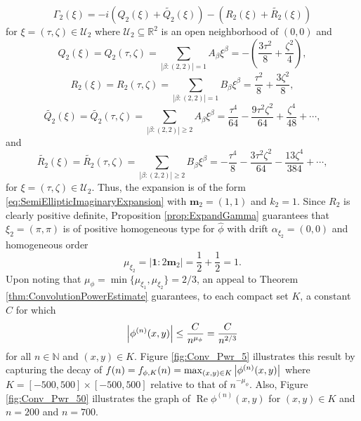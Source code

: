 \documentclass[11pt]{article}
\newenvironment{example}
  {\pushQED{\qed}\renewcommand{\qedsymbol}{$\triangle$}\examplex}
  {\popQED\endexamplex}
\theoremstyle{remark}
\renewcommand\Re{\operatorname{Re}}%
\begin{document}
\begin{example}
\begin{equation*}
    \Gamma_2(\xi)=-i\left(Q_2(\xi)+\widetilde{Q_2}(\xi)\right)-\left(R_2(\xi)+\widetilde{R_2}(\xi)\right)
\end{equation*}
for $\xi=(\tau,\zeta)\in\mathcal{U}_2$ where $\mathcal{U}_2\subseteq\mathbb{R}^2$ is an open neighborhood of $(0,0)$ and 
\begin{equation*}
    Q_2(\xi)=Q_2(\tau,\zeta)=\sum_{|\beta:(2,2)|=1}A_\beta \xi^\beta=-\left(\frac{3\tau^2}{8}+\frac{\zeta^2}{4}\right),
\end{equation*}
\begin{equation*}
    R_2(\xi)=R_2(\tau,\zeta)=\sum_{|\beta:(2,2)|=1}B_\beta\xi^\beta=\frac{\tau^2}{8}+\frac{3\zeta^2}{8},
\end{equation*}
\begin{equation*}
    \widetilde{Q_2}(\xi)=\widetilde{Q_2}(\tau,\zeta)=\sum_{|\beta:(2,2)|\geq 2}A_\beta\xi^\beta=\frac{\tau^4}{64}-\frac{9\tau^2\zeta^2}{64}+\frac{\zeta^4}{48}+\cdots,
\end{equation*}
and
\begin{equation*}
    \widetilde{R_2}(\xi)=\widetilde{R_2}(\tau,\zeta)=\sum_{|\beta:(2,2)|\geq 2}B_\beta\xi^\beta=-\frac{\tau^4}{8}-\frac{3\tau^2\zeta^2}{64}-\frac{13\zeta^4}{384}+\cdots,
\end{equation*}
for $\xi=(\tau,\zeta)\in\mathcal{U}_2$. Thus, the expansion is of the form \eqref{eq:SemiEllipticImaginaryExpansion} with $\mathbf{m}_2=(1,1)$ and $k_2=1$. Since $R_2$ is clearly positive definite, Proposition \ref{prop:ExpandGamma} guarantees that $\xi_2=(\pi,\pi)$ is of positive homogeneous type for $\widehat{\phi}$ with drift $\alpha_{\xi_2}=(0,0)$ and homogeneous order
\begin{equation*}
    \mu_{\xi_2}=|\mathbf{1}:2\mathbf{m}_2|=\frac{1}{2}+\frac{1}{2}=1.
\end{equation*}
Upon noting that $\mu_{\phi}=\min\{\mu_{\xi_1},\mu_{\xi_2}\}=2/3$, an appeal to Theorem \ref{thm:ConvolutionPowerEstimate} guarantees, to each compact set $K$, a constant $C$ for which
\begin{equation}
    \abs{\phi^{(n)}(x,y)}\leq\frac{C}{n^{\mu_\phi}}=\frac{C}{n^{2/3}}
\end{equation}
for all $n\in\mathbb{N}$ and $(x,y)\in K$. Figure \ref{fig:Conv_Pwr_5} illustrates this result by capturing the decay of $f(n)=f_{\phi,K}(n)=\max_{(x,y)\in K}\abs{\phi^{(n)}(x,y)}$ where $K=[-500,500]\times [-500,500]$ relative to that of $n^{-\mu_\phi}$. Also, Figure \ref{fig:Conv_Pwr_50} illustrates the graph of $\Re \phi^{(n)}(x,y)$ for $(x,y)\in K$ and $n=200$ and $n=700$.



\end{example}
\end{document}
